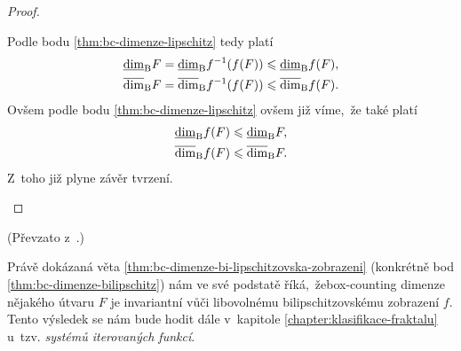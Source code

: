 \begin{proof}
\begin{enumerate}[label=\textit{(\roman*)}]
        Podle bodu \ref{thm:bc-dimenze-lipschitz} tedy platí
        \begin{align*}
            \underline{\dim}_\textup{B}{F}&=\underline{\dim}_\textup{B}{f^{-1}(f(F))}\leqslant\underline{\dim}_\textup{B}{f(F)},\\
            \overline{\dim}_\textup{B}{F}&=\overline{\dim}_\textup{B}{f^{-1}(f(F))}\leqslant\overline{\dim}_\textup{B}{f(F)}.
        \end{align*}
        Ovšem podle bodu \ref{thm:bc-dimenze-lipschitz} ovšem již víme,~že také platí
        \begin{align*}
            \underline{\dim}_\textup{B}{f(F)}&\leqslant\underline{\dim}_\textup{B}{F},\\
            \overline{\dim}_\textup{B}{f(F)}&\leqslant\overline{\dim}_\textup{B}{F}.
        \end{align*}
        Z~toho již plyne závěr tvrzení.
    \end{enumerate}
\end{proof}
(Převzato z~\citep[str. 36]{Falconer2014}.)

Právě dokázaná věta \ref{thm:bc-dimenze-bi-lipschitzovska-zobrazeni} (konkrétně bod \ref{thm:bc-dimenze-bilipschitz}) nám ve své podstatě říká,~že\linebreak{}box-counting dimenze nějakého útvaru $F$ je invariantní vůči libovolnému bilipschitzovskému zobrazení $f$. Tento výsledek se nám bude hodit dále v~kapitole \ref{chapter:klasifikace-fraktalu} u~tzv. \emph{systémů iterovaných funkcí}. 